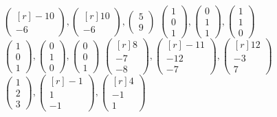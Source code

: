 \begin{tasks}[
    start=68,
    style=enumerate,
    item-indent = 0.9cm,
    label-offset = 3mm,
    ]
    \task $\begin{pmatrix*}[r]-10 \\ -6\end{pmatrix*},\begin{pmatrix*}[r]10 \\ -6\end{pmatrix*},\begin{pmatrix*}5 \\ 9\end{pmatrix*}$
    \task $\begin{pmatrix*}1 \\ 0 \\ 1\end{pmatrix*},\begin{pmatrix*}0 \\ 1 \\ 1\end{pmatrix*},\begin{pmatrix*}1 \\ 1 \\ 0\end{pmatrix*}$
    \task $\begin{pmatrix*}1 \\ 0 \\ 1\end{pmatrix*},\begin{pmatrix*}0 \\ 1 \\ 0\end{pmatrix*},\begin{pmatrix*}0 \\ 0 \\ 1\end{pmatrix*}$
    \task $\begin{pmatrix*}[r]8 \\ -7 \\ -8\end{pmatrix*},\begin{pmatrix*}[r]-11 \\ -12 \\ -7\end{pmatrix*},\begin{pmatrix*}[r]12 \\ -3 \\ 7\end{pmatrix*}$
    \task $\begin{pmatrix*}1 \\ 2 \\ 3\end{pmatrix*},\begin{pmatrix*}[r]-1 \\ 1 \\ -1\end{pmatrix*},\begin{pmatrix*}[r]4 \\ -1 \\ 1\end{pmatrix*}$

\end{tasks}
